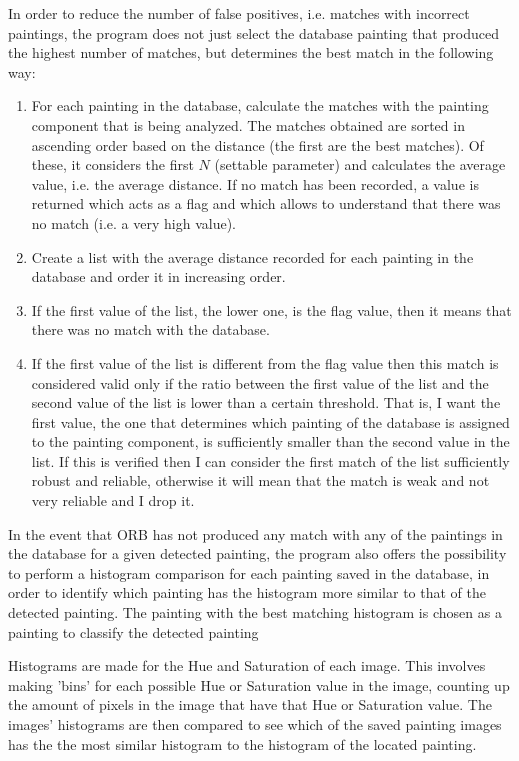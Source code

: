 \documentclass[10pt,twocolumn,letterpaper]{article}
\begin{document}
In order to reduce the number of false positives, i.e. matches with incorrect paintings, the program does not just select the database painting that produced the highest number of matches, but determines the best match in the following way:
\begin{enumerate}
   \item For each painting in the database, calculate the matches with the painting component that is being analyzed. The matches obtained are sorted in ascending order based on the distance (the first are the best matches). Of these, it considers the first $N$ (settable parameter) and calculates the average value, i.e. the average distance. If no match has been recorded, a value is returned which acts as a flag and which allows to understand that there was no match (i.e. a very high value).
   
   \item Create a list with the average distance recorded for each painting in the database and order it in increasing order.
   
   \item If the first value of the list, the lower one, is the flag value, then it means that there was no match with the database.
   
   \item If the first value of the list is different from the flag value then this match is considered valid only if the ratio between the first value of the list and the second value of the list is lower than a certain threshold. That is, I want the first value, the one that determines which painting of the database is assigned to the painting component, is sufficiently smaller than the second value in the list. If this is verified then I can consider the first match of the list sufficiently robust and reliable, otherwise it will mean that the match is weak and not very reliable and I drop it.
\end{enumerate}

In the event that ORB has not produced any match with any of the paintings in the database for a given detected painting, the program also offers the possibility to perform a histogram comparison for each painting saved in the database, in order to identify which painting has the histogram more similar to that of the detected painting. The painting with the best matching histogram is chosen as a painting to classify the detected painting

Histograms are made for the Hue and Saturation of each image. This involves making 'bins' for each possible Hue or Saturation value in the image, counting up the amount of pixels in the image that have that Hue or Saturation value. The images' histograms are then compared to see which of the saved painting images has the the most similar histogram to the histogram of the located painting.  
\end{document}
